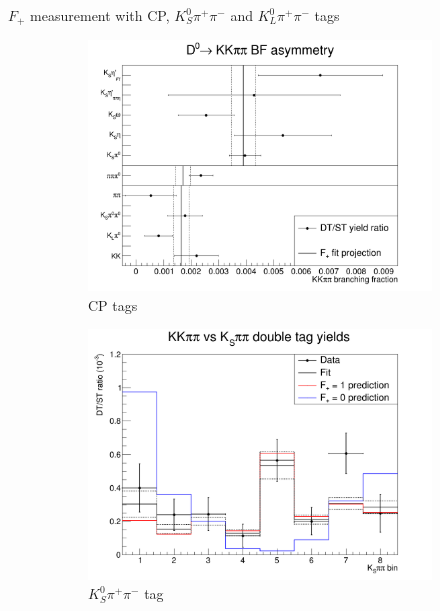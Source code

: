 \documentclass{beamer}
\begin{document}
\begin{frame}{$F_+$ measurement with CP, $K^0_S\pi^+\pi^-$ and $K^0_L\pi^+\pi^-$ tags}
  \begin{figure}
    \begin{subfigure}{0.40\textwidth}
      \includegraphics[width = 1.0\textwidth]{Plots/CPeven_fraction_combination_CPtags.png}
      \caption{CP tags}
    \end{subfigure}
    \begin{subfigure}{0.35\textwidth}
      \includegraphics[width = 1.0\textwidth]{Plots/CPeven_fraction_combination_KSpipi.png}
      \caption{$K^0_S\pi^+\pi^-$ tag}
    \end{subfigure}%
    \begin{subfigure}{0.35\textwidth}

\end{subfigure}
\end{figure}
\end{frame}
\end{document}
